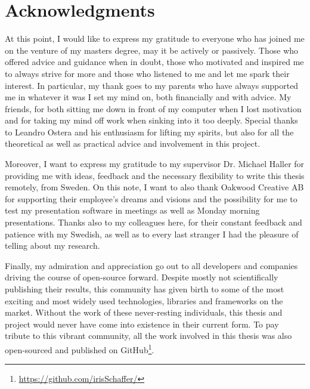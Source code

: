 \chapter{Acknowledgments}
At this point, I would like to express my gratitude to everyone who has joined me on the venture of my masters degree, may it be actively or passively. Those who offered advice and guidance when in doubt, those who motivated and inspired me to always strive for more and those who listened to me and let me spark their interest. In particular, my thank goes to my parents who have always supported me in whatever it was I set my mind on, both financially and with advice. My friends, for both sitting me down in front of my computer when I lost motivation and for taking my mind off work when sinking into it too deeply. Special thanks to Leandro Ostera and his enthusiasm for lifting my spirits, but also for all the theoretical as well as practical advice and involvement in this project.

Moreover, I want to express my gratitude to my supervisor Dr. Michael Haller for providing me with ideas, feedback and the necessary flexibility to write this thesis remotely, from Sweden. On this note, I want to also thank Oakwood Creative AB for supporting their employee's dreams and visions and the possibility for me to test my presentation software in meetings as well as Monday morning presentations. Thanks also to my colleagues here, for their constant feedback and patience with my Swedish, as well as to every last stranger I had the pleasure of telling about my research.

Finally, my admiration and appreciation go out to all developers and companies driving the course of open-source forward. Despite mostly not scientifically publishing their results, this community has given birth to some of the most exciting and most widely used technologies, libraries and frameworks on the market. Without the work of these never-resting individuals, this thesis and project would never have come into existence in their current form. To pay tribute to this vibrant community, all the work involved in this thesis was also open-sourced and published on GitHub\footnote{\href{https://github.com/irisSchaffer?tab=repositories}{\textsf{https://github.com/irisSchaffer/}}}.